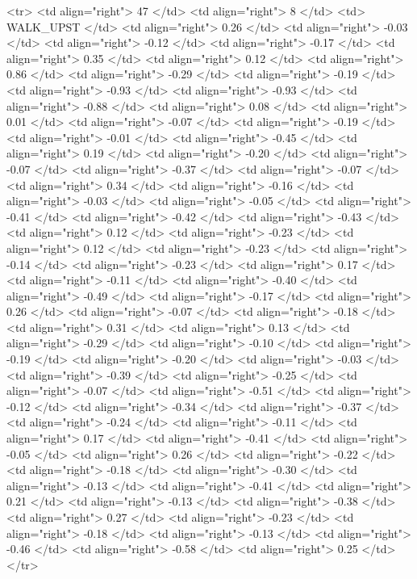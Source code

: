   <tr> <td align="right"> 47 </td> <td align="right">   8 </td> <td> WALK_UPST </td> <td align="right"> 0.26 </td> <td align="right"> -0.03 </td> <td align="right"> -0.12 </td> <td align="right"> -0.17 </td> <td align="right"> 0.35 </td> <td align="right"> 0.12 </td> <td align="right"> 0.86 </td> <td align="right"> -0.29 </td> <td align="right"> -0.19 </td> <td align="right"> -0.93 </td> <td align="right"> -0.93 </td> <td align="right"> -0.88 </td> <td align="right"> 0.08 </td> <td align="right"> 0.01 </td> <td align="right"> -0.07 </td> <td align="right"> -0.19 </td> <td align="right"> -0.01 </td> <td align="right"> -0.45 </td> <td align="right"> 0.19 </td> <td align="right"> -0.20 </td> <td align="right"> -0.07 </td> <td align="right"> -0.37 </td> <td align="right"> -0.07 </td> <td align="right"> 0.34 </td> <td align="right"> -0.16 </td> <td align="right"> -0.03 </td> <td align="right"> -0.05 </td> <td align="right"> -0.41 </td> <td align="right"> -0.42 </td> <td align="right"> -0.43 </td> <td align="right"> 0.12 </td> <td align="right"> -0.23 </td> <td align="right"> 0.12 </td> <td align="right"> -0.23 </td> <td align="right"> -0.14 </td> <td align="right"> -0.23 </td> <td align="right"> 0.17 </td> <td align="right"> -0.11 </td> <td align="right"> -0.40 </td> <td align="right"> -0.49 </td> <td align="right"> -0.17 </td> <td align="right"> 0.26 </td> <td align="right"> -0.07 </td> <td align="right"> -0.18 </td> <td align="right"> 0.31 </td> <td align="right"> 0.13 </td> <td align="right"> -0.29 </td> <td align="right"> -0.10 </td> <td align="right"> -0.19 </td> <td align="right"> -0.20 </td> <td align="right"> -0.03 </td> <td align="right"> -0.39 </td> <td align="right"> -0.25 </td> <td align="right"> -0.07 </td> <td align="right"> -0.51 </td> <td align="right"> -0.12 </td> <td align="right"> -0.34 </td> <td align="right"> -0.37 </td> <td align="right"> -0.24 </td> <td align="right"> -0.11 </td> <td align="right"> 0.17 </td> <td align="right"> -0.41 </td> <td align="right"> -0.05 </td> <td align="right"> 0.26 </td> <td align="right"> -0.22 </td> <td align="right"> -0.18 </td> <td align="right"> -0.30 </td> <td align="right"> -0.13 </td> <td align="right"> -0.41 </td> <td align="right"> 0.21 </td> <td align="right"> -0.13 </td> <td align="right"> -0.38 </td> <td align="right"> 0.27 </td> <td align="right"> -0.23 </td> <td align="right"> -0.18 </td> <td align="right"> -0.13 </td> <td align="right"> -0.46 </td> <td align="right"> -0.58 </td> <td align="right"> 0.25 </td> </tr>
